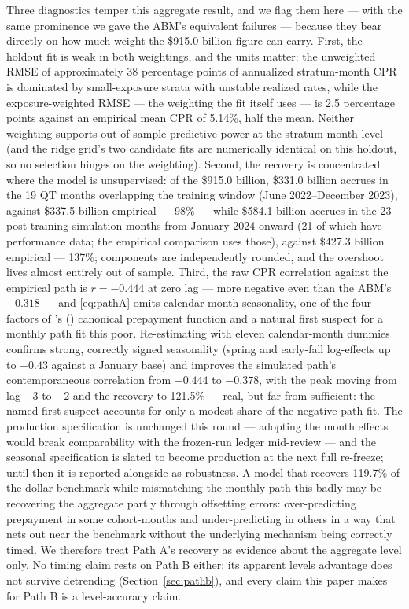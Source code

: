 \documentclass[12pt]{article}
\newcommand{\citepos}[1]{\citeauthor{#1}'s (\citeyear{#1})}
\begin{document}
Three diagnostics temper this aggregate result, and we flag them here --- with the same prominence we gave the ABM's equivalent failures --- because they bear directly on how much weight the \$915.0 billion figure can carry. First, the holdout fit is weak in both weightings, and the units matter: the unweighted RMSE of approximately 38 percentage points of annualized stratum-month CPR is dominated by small-exposure strata with unstable realized rates, while the exposure-weighted RMSE --- the weighting the fit itself uses --- is 2.5 percentage points against an empirical mean CPR of 5.14\%, half the mean. Neither weighting supports out-of-sample predictive power at the stratum-month level (and the ridge grid's two candidate fits are numerically identical on this holdout, so no selection hinges on the weighting). Second, the recovery is concentrated where the model is unsupervised: of the \$915.0 billion, \$331.0 billion accrues in the 19 QT months overlapping the training window (June 2022--December 2023), against \$337.5 billion empirical --- 98\% --- while \$584.1 billion accrues in the 23 post-training simulation months from January 2024 onward (21 of which have performance data; the empirical comparison uses those), against \$427.3 billion empirical --- 137\%; components are independently rounded, and the overshoot lives almost entirely out of sample. Third, the raw CPR correlation against the empirical path is $r = -0.444$ at zero lag --- more negative even than the ABM's $-0.318$ --- and \eqref{eq:pathA} omits calendar-month seasonality, one of the four factors of \citepos{richard1989} canonical prepayment function and a natural first suspect for a monthly path fit this poor. Re-estimating with eleven calendar-month dummies confirms strong, correctly signed seasonality (spring and early-fall log-effects up to $+0.43$ against a January base) and improves the simulated path's contemporaneous correlation from $-0.444$ to $-0.378$, with the peak moving from lag $-3$ to $-2$ and the recovery to 121.5\% --- real, but far from sufficient: the named first suspect accounts for only a modest share of the negative path fit. The production specification is unchanged this round --- adopting the month effects would break comparability with the frozen-run ledger mid-review --- and the seasonal specification is slated to become production at the next full re-freeze; until then it is reported alongside as robustness. A model that recovers 119.7\% of the dollar benchmark while mismatching the monthly path this badly may be recovering the aggregate partly through offsetting errors: over-predicting prepayment in some cohort-months and under-predicting in others in a way that nets out near the benchmark without the underlying mechanism being correctly timed. We therefore treat Path A's recovery as evidence about the aggregate level only. No timing claim rests on Path B either: its apparent levels advantage does not survive detrending (Section~\ref{sec:pathb}), and every claim this paper makes for Path B is a level-accuracy claim.
\end{document}

